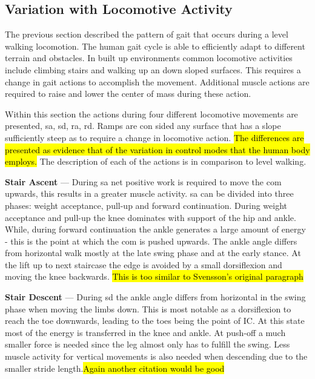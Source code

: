 \subsection{Variation with Locomotive Activity}
The previous section described the pattern of gait that occurs during a level walking locomotion. The human gait cycle is able to efficiently adapt to different terrain and obstacles. In built up environments common locomotive activities include climbing stairs and walking up an down sloped surfaces. This requires a change in gait actions to accomplish the movement. Additional muscle actions are required to raise and lower the center of mass during these action\cite{Franz2012a}. 

Within this section the actions during four different locomotive movements are presented, \acrfull{sa}, \acrfull{sd}, \acrfull{ra}, \acrfull{rd}. Ramps are con sided any surface that has a slope sufficiently steep as to require a change in locomotive action. \hl{The differences are presented as evidence that of the variation in control modes that the human body employs.} %
The description of each of the actions is in comparison to level walking.

\textbf{Stair Ascent} --- During \acrshort{sa} net positive work is required to move the \acrfull{com} upwards, this results in a greater muscle activity. \acrshort{sa} can be divided into three phases: weight acceptance, pull-up and forward continuation. During weight acceptance and pull-up the knee dominates with support of the hip and ankle. While, during forward continuation the ankle generates a large amount of energy - this is the point at which the  \acrshort{com} is pushed upwards. The ankle angle differs from horizontal walk mostly at the late swing phase and at the early stance. At the lift up to next staircase the edge is avoided by a small dorsiflexion and moving the knee backwards.\cite{Svensson2007} \hl{This is too similar to Svensson's original paragraph} 

\textbf{Stair Descent} --- During \acrshort{sd} the ankle angle differs from horizontal in the swing phase when moving the limbs down. This is most notable as a dorsiflexion to reach the toe downwards, leading to the toes being the point of IC. At this state most of the energy is transferred in the knee and ankle. At push-off a much smaller force is needed since the leg almost only has to fulfill the swing. Less muscle activity for vertical movements is also needed when descending due to the smaller stride length.\cite{Svensson2007}\hl{Again another citation would be good}

